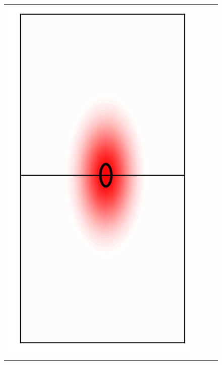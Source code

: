 \documentclass[10pt,final,xcolor=dvipsnames]{beamer}
\begin{document}
\begin{frame}
\begin{figure}
{\begin{tabular}{cccc}
	    \includegraphics[scale=0.2]{localpsf_revised_figures/ricker_ellipsoid_a=0.249.png} & 

\end{tabular}}
\end{figure}
\end{frame}
\end{document}
